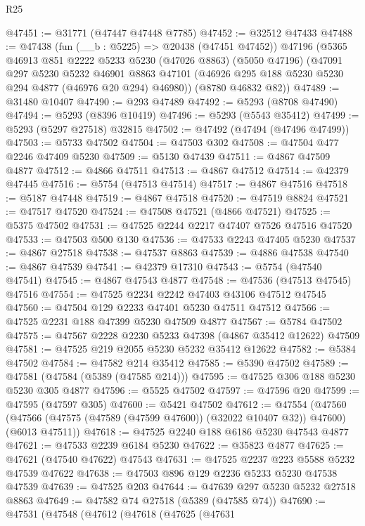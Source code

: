 \begin{lexlean}{R25}
\begin{coremodule}
@47451 := @31771 (@47447 @47448 @7785)
@47452 := @32512 @47433
@47488 := @47438
    (fun (__b : @5225) => @20438 (@47451 @47452))
    @47196
    (@5365
      @46913
      @851
      @2222
      @5233
      @5230
      (@47026 @8863)
      (@5050 @47196)
      (@47091
        @297
        @5230
        @5232
        @46901
        @8863
        @47101
        (@46926 @295 @188 @5230 @5230 @294 @4877 (@46976 @20 @294) @46980))
      (@8780 @46832 @82))
@47489 := @31480 @10407
@47490 := @293 @47489
@47492 := @5293 (@8708 @47490)
@47494 := @5293 (@8396 @10419)
@47496 := @5293 (@5543 @35412)
@47499 := @5293 (@5297 @27518) @32815
@47502 := @47492 (@47494 (@47496 @47499))
@47503 := @5733 @47502
@47504 := @47503 @302
@47508 := @47504 @477 @2246 @47409 @5230
@47509 := @5130 @47439
@47511 := @4867 @47509 @4877
@47512 := @4866 @47511
@47513 := @4867 @47512
@47514 := @42379 @47445
@47516 := @5754 (@47513 @47514)
@47517 := @4867 @47516
@47518 := @5187 @47448
@47519 := @4867 @47518
@47520 := @47519 @8824
@47521 := @47517 @47520
@47524 := @47508 @47521 (@4866 @47521)
@47525 := @5375 @47502
@47531 := @47525 @2244 @2217 @47407 @7526 @47516 @47520
@47533 := @47503 @500 @130
@47536 := @47533 @2243 @47405 @5230
@47537 := @4867 @27518
@47538 := @47537 @8863
@47539 := @4886 @47538
@47540 := @4867 @47539
@47541 := @42379 @17310
@47543 := @5754 (@47540 @47541)
@47545 := @4867 @47543 @4877
@47548 := @47536 (@47513 @47545) @47516
@47554 := @47525 @2234 @2242 @47403 @43106 @47512 @47545
@47560 := @47504 @129 @2233 @47401 @5230 @47511 @47512
@47566 := @47525 @2231 @188 @47399 @5230 @47509 @4877
@47567 := @5784 @47502
@47575 := @47567 @2228 @2230 @5233 @47398 (@4867 @35412 @12622) @47509
@47581 := @47525 @219 @2055 @5230 @5232 @35412 @12622
@47582 := @5384 @47502
@47584 := @47582 @214 @35412
@47585 := @5390 @47502
@47589 := @47581 (@47584 (@5389 (@47585 @214)))
@47595 := @47525 @306 @188 @5230 @5230 @305 @4877
@47596 := @5525 @47502
@47597 := @47596 @20
@47599 := @47595 (@47597 @305)
@47600 := @5421 @47502
@47612 := @47554
    (@47560 (@47566 (@47575 (@47589 (@47599 @47600)) (@32022 @10407 @32)) @47600) (@6013 @47511))
@47618 := @47525 @2240 @188 @6186 @5230 @47543 @4877
@47621 := @47533 @2239 @6184 @5230
@47622 := @35823 @4877
@47625 := @47621 (@47540 @47622) @47543
@47631 := @47525 @2237 @223 @5588 @5232 @47539 @47622
@47638 := @47503 @896 @129 @2236 @5233 @5230 @47538 @47539
@47639 := @47525 @203
@47644 := @47639 @297 @5230 @5232 @27518 @8863
@47649 := @47582 @74 @27518 (@5389 (@47585 @74))
@47690 := @47531
    (@47548
      (@47612
        (@47618
          (@47625
            (@47631

\end{coremodule}
\end{lexlean}
